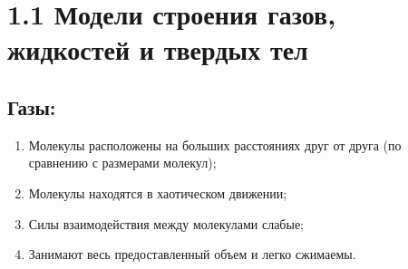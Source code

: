 \documentclass[a4paper,12pt]{article}
\begin{document}
\begin{center}
\end{center}

\vspace{-2.5em}







\section*{1.1 Модели строения газов, жидкостей и твердых тел}

\vspace{-9pt}
\subsection*{Газы:}
\vspace{-3pt}
\begin{enumerate}[itemsep=0pt, topsep=0pt, parsep=0pt]
  \item Молекулы расположены на больших расстояниях друг от друга (по сравнению с размерами молекул);
  \item Молекулы находятся в хаотическом движении;
  \item Силы взаимодействия между молекулами слабые;
  \item Занимают весь предоставленный объем и легко сжимаемы.
\end{enumerate}

\vspace{-9pt}
\end{document}
